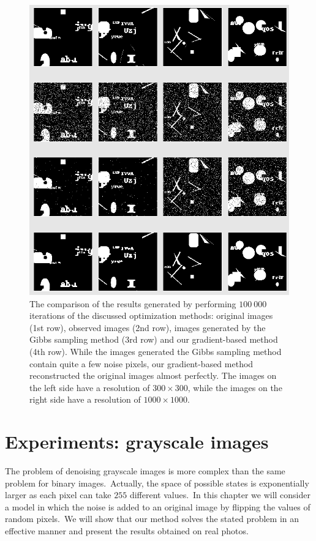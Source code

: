 \documentclass[shortabstract, english, lic]{iithesis}
\newcommand\numberedchapter[1]{\setlength\topskip{3cm}\chapter{#1}\setlength\topskip{0cm}}
\theoremstyle{default_theorem_style}\newtheorem{theorem}{Theorem}
\theoremstyle{default_theorem_style}\newtheorem{definition}{Definition}
\begin{document}
\begin{figure}[H]
\centering
\includegraphics[scale=0.52]{binary_qualitative_results}
\caption{The comparison of the results generated by performing $100\ 000$ iterations of the discussed optimization
methods: original images (1st row), observed images (2nd row), images generated by the Gibbs
sampling method (3rd row) and our gradient-based method (4th row). While the images generated the Gibbs sampling
method contain quite a few noise pixels, our gradient-based method reconstructed the original images almost
perfectly. The images on the left side have a resolution of $300{\times}300$, while the images on the right side
have a resolution of $1000{\times}1000$.}
\label{fig:binary_qualitative_results}
\end{figure}

\numberedchapter{Experiments: grayscale images}\label{chapter:grayscale_experiments}

The problem of denoising grayscale images is more complex than the same problem for binary
images.\ Actually, the space of possible states is exponentially larger as each pixel can take $255$ different
values.\ In this chapter we will consider a model in which the noise is added to an original image by flipping
the values of random pixels.\ We will show that our method solves the stated problem in an effective manner
and present the results obtained on real photos.
\end{document}
